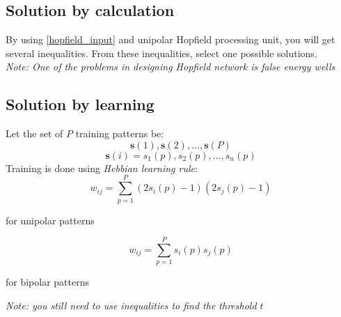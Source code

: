 \subsection{Solution by calculation}
By using \ref{hopfield_input} and unipolar Hopfield processing unit, you will get several inequalities. From these inequalities, select one possible solutions. \\
\textit{Note: One of the problems in designing Hopfield network is false energy wells}

\subsection{Solution by learning}
Let the set of $P$ training patterns be:
$${\mathbf{s}(1), \mathbf{s}(2), \ldots, \mathbf{s}(P)}$$
$$\mathbf{s}(i) = s_1(p), s_2(p), \ldots , s_n(p)$$
Training is done using \emph{Hebbian learning rule}:
$$w_{ij} = \sum_{p=1}^{P} (2s_i(p) - 1)(2s_j(p) - 1)$$
\begin{center}for unipolar patterns \end{center}

$$w_{ij} = \sum_{p=1}^{P} s_i(p) s_j(p)$$
\begin{center}for bipolar patterns \end{center}

\noindent \textit{Note: you still need to use inequalities to find the threshold $t$}